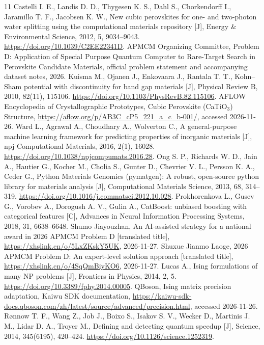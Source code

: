 \clearpage
\begin{thebibliography}{11}
 Castelli I. E., Landis D. D., Thygesen K. S., Dahl S., Chorkendorff I., Jaramillo T. F., Jacobsen K. W., New cubic perovskites for one- and two-photon water splitting using the computational materials repository [J], Energy \& Environmental Science, 2012, 5, 9034--9043. \url{https://doi.org/10.1039/C2EE22341D}.
 APMCM Organizing Committee, Problem D: Application of Special Purpose Quantum Computer to Rare-Target Search in Perovskite Candidate Materials, official problem statement and accompanying dataset notes, 2026.
 Kuisma M., Ojanen J., Enkovaara J., Rantala T. T., Kohn--Sham potential with discontinuity for band gap materials [J], Physical Review B, 2010, 82(11), 115106. \url{https://doi.org/10.1103/PhysRevB.82.115106}.
 AFLOW Encyclopedia of Crystallographic Prototypes, Cubic Perovskite (CaTiO$_3$) Structure, \url{https://aflow.org/p/AB3C_cP5_221_a_c_b-001/}, accessed 2026-11-26.
 Ward L., Agrawal A., Choudhary A., Wolverton C., A general-purpose machine learning framework for predicting properties of inorganic materials [J], npj Computational Materials, 2016, 2(1), 16028. \url{https://doi.org/10.1038/npjcompumats.2016.28}.
 Ong S. P., Richards W. D., Jain A., Hautier G., Kocher M., Cholia S., Gunter D., Chevrier V. L., Persson K. A., Ceder G., Python Materials Genomics (pymatgen): A robust, open-source python library for materials analysis [J], Computational Materials Science, 2013, 68, 314--319. \url{https://doi.org/10.1016/j.commatsci.2012.10.028}.
 Prokhorenkova L., Gusev G., Vorobev A., Dorogush A. V., Gulin A., CatBoost: unbiased boosting with categorical features [C], Advances in Neural Information Processing Systems, 2018, 31, 6638--6648.
 Shumo Jiayouzhan, An AI-assisted strategy for a national award in 2026 APMCM Problem D [translated title], \url{https://xhslink.cn/o/5LxZKskY5UK}, 2026-11-27.
 Shuxue Jianmo Laoge, 2026 APMCM Problem D: An expert-level solution approach [translated title], \url{https://xhslink.cn/o/4SqQmBiyKO6}, 2026-11-27.
 Lucas A., Ising formulations of many NP problems [J], Frontiers in Physics, 2014, 2, 5. \url{https://doi.org/10.3389/fphy.2014.00005}.
 QBoson, Ising matrix precision adaptation, Kaiwu SDK documentation, \url{https://kaiwu-sdk-docs.qboson.com/zh/latest/source/advanced/precision.html}, accessed 2026-11-26.
 R{\o}nnow T. F., Wang Z., Job J., Boixo S., Isakov S. V., Wecker D., Martinis J. M., Lidar D. A., Troyer M., Defining and detecting quantum speedup [J], Science, 2014, 345(6195), 420--424. \url{https://doi.org/10.1126/science.1252319}.
\end{thebibliography}
